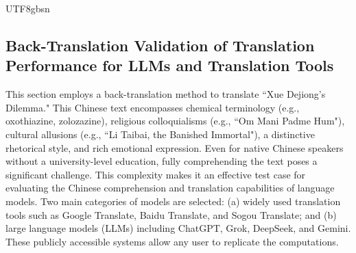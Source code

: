\documentclass[conference]{IEEEtran}
\begin{document}
\begin{CJK*}{UTF8}{gbsn}




\subsection{Back-Translation Validation of Translation Performance for LLMs and Translation Tools}
This section employs a back-translation method \citep{ahmadnia2021impact} to translate “Xue Dejiong’s Dilemma." This Chinese text encompasses chemical terminology (e.g., oxothiazine, zolozazine), religious colloquialisms (e.g., “Om Mani Padme Hum"), cultural allusions (e.g., “Li Taibai, the Banished Immortal"), a distinctive rhetorical style, and rich emotional expression. Even for native Chinese speakers without a university-level education, fully comprehending the text poses a significant challenge. This complexity makes it an effective test case for evaluating the Chinese comprehension and translation capabilities of language models. Two main categories of models are selected: (a) widely used translation tools such as Google Translate, Baidu Translate, and Sogou Translate; and (b) large language models (LLMs) including ChatGPT, Grok, DeepSeek, and Gemini. These publicly accessible systems allow any user to replicate the computations.


\end{CJK*}
\end{document}
